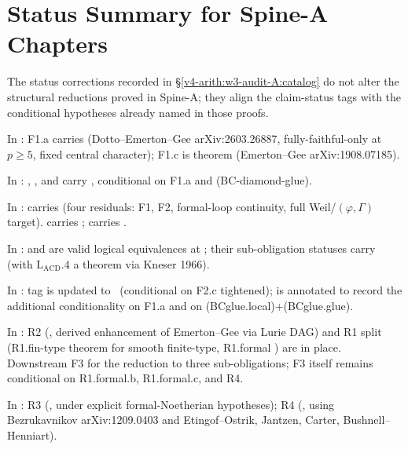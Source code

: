 \section{Status Summary for Spine-A Chapters}
\label{v4-arith:w3-audit-A:summary}

The status corrections recorded in \S\ref{v4-arith:w3-audit-A:catalog}
do not alter the structural reductions proved in Spine-A; they
align the claim-status tags with the conditional hypotheses already
named in those proofs.

In : F1.a carries \ClaimStatusNeedsVerification
(Dotto--Emerton--Gee arXiv:2603.26887, fully-faithful-only at \(p\geq 5\),
fixed central character); F1.c is theorem (Emerton--Gee arXiv:1908.07185).

In : ,
, and 
carry \ClaimStatusNeedsVerification, conditional on F1.a and (BC-diamond-glue).

In :  carries
\ClaimStatusConjectured (four residuals: F1, F2, formal-loop continuity,
full Weil/\((\varphi,\Gamma)\) target).
 carries
\ClaimStatusNeedsVerification;
 carries
\ClaimStatusConjectured.

In :  and
 are valid logical equivalences
at \ClaimStatusProvedHere; their sub-obligation statuses carry
\ClaimStatusConjectured (with \(\mathrm{L}_{\mathrm{ACD}}.4\) a theorem
via Kneser 1966).

In : 
tag is updated to \ClaimStatusProvedHereConditional\ (conditional on
F2.c tightened);  is annotated
to record the additional conditionality on F1.a and on
(BCglue.local)+(BCglue.glue).

In : R2 (\ClaimStatusProvedHere, derived
enhancement of Emerton--Gee via Lurie DAG) and R1 split
(R1.fin-type theorem for smooth finite-type, R1.formal
\ClaimStatusConjectured) are in place. Downstream F3
\ClaimStatusProvedHere for the reduction to three sub-obligations;
F3 itself remains conditional on R1.formal.b, R1.formal.c, and R4.

In : R3 (\ClaimStatusProvedHere,
under explicit formal-Noetherian hypotheses); R4
(\ClaimStatusNeedsVerification, using Bezrukavnikov arXiv:1209.0403
and Etingof--Ostrik, Jantzen, Carter, Bushnell--Henniart).

